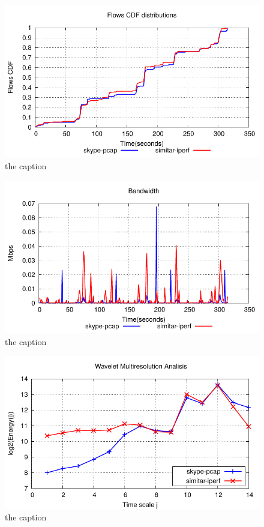 \begin{figure}[!ht]
	\centering
	\includegraphics[scale=0.75]{figures/ch5/iperfFlowCdf.pdf}
	\caption{the caption}
	\label{fig:iperfFlowCdf}
\end{figure}

\begin{figure}[!ht]
	\centering
	\includegraphics[scale=0.75]{figures/ch5/iperfBandwidth.pdf}
	\caption{the caption}
	\label{fig:iperfBandwidth}
\end{figure}

\begin{figure}[!ht]
	\centering
	\includegraphics[scale=0.75]{figures/ch5/iperfWaveletMREA.pdf}
	\caption{the caption}
	\label{fig:iperfWaveletMREA}
\end{figure}

